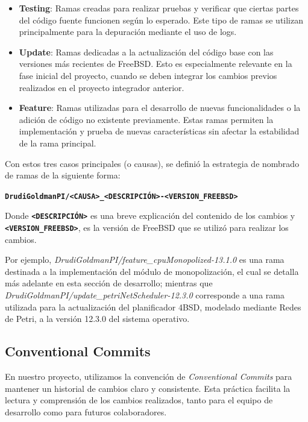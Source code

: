 \begin{itemize}
    \item \textbf{Testing}: Ramas creadas para realizar pruebas y verificar que ciertas partes del código fuente funcionen según lo esperado. Este tipo de ramas se utilizan principalmente para la depuración mediante el uso de logs.
    \item \textbf{Update}: Ramas dedicadas a la actualización del código base con las versiones más recientes de FreeBSD. Esto es especialmente relevante en la fase inicial del proyecto, cuando se deben integrar los cambios previos realizados en el proyecto integrador anterior.
    \item \textbf{Feature}: Ramas utilizadas para el desarrollo de nuevas funcionalidades o la adición de código no existente previamente. Estas ramas permiten la implementación y prueba de nuevas características sin afectar la estabilidad de la rama principal.
\end{itemize}

Con estos tres casos principales (o causas), se definió la estrategia de nombrado de ramas de la siguiente forma:

\begin{center}
    \texttt{\textbf{DrudiGoldmanPI/<CAUSA>\_<DESCRIPCIÓN>-<VERSION\_FREEBSD>}}
\end{center}

Donde \texttt{\textbf{<DESCRIPCIÓN>}} es una breve explicación del contenido de los cambios y \texttt{\textbf{<VERSION\_FREEBSD>}}, es la versión de FreeBSD que se utilizó para realizar los cambios.

Por ejemplo, \textit{DrudiGoldmanPI/feature\_cpuMonopolized-13.1.0} es una rama destinada a la implementación del módulo de monopolización, el cual se detalla más adelante en esta sección de desarrollo; mientras que \textit{DrudiGoldmanPI/update\_petriNetScheduler-12.3.0} corresponde a una rama utilizada para la actualización del planificador 4BSD, modelado mediante Redes de Petri, a la versión 12.3.0 del sistema operativo.\par

\subsection{Conventional Commits}
En nuestro proyecto, utilizamos la convención de \textit{Conventional Commits} para mantener un historial de cambios claro y consistente. Esta práctica facilita la lectura y comprensión de los cambios realizados, tanto para el equipo de desarrollo como para futuros colaboradores.\par


